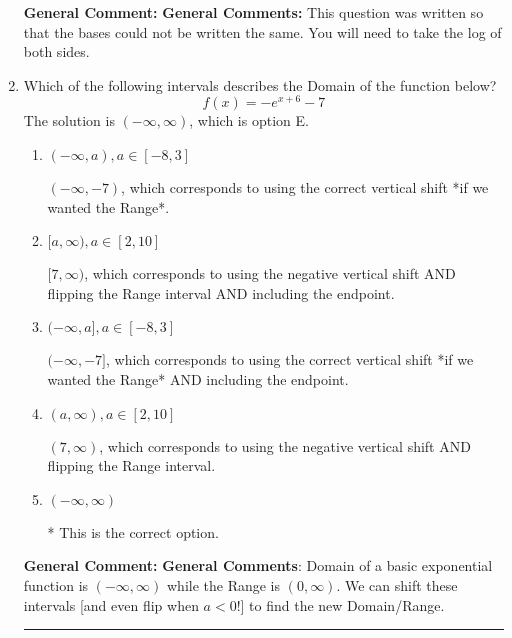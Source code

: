 \documentclass{extbook}[14pt]
\newcommand{\litem}[1]{\item #1

\rule{\textwidth}{0.4pt}}
\begin{document}
\begin{enumerate}
{\textbf{General Comment:} \textbf{General Comments:} This question was written so that the bases could not be written the same. You will need to take the log of both sides.
}
\litem{
Which of the following intervals describes the Domain of the function below?
\[ f(x) = -e^{x+6}-7 \]The solution is \( (-\infty, \infty) \), which is option E.\begin{enumerate}[label=\Alph*.]
\item \( (-\infty, a), a \in [-8, 3] \)

$(-\infty, -7)$, which corresponds to using the correct vertical shift *if we wanted the Range*.
\item \( [a, \infty), a \in [2, 10] \)

$[7, \infty)$, which corresponds to using the negative vertical shift AND flipping the Range interval AND including the endpoint.
\item \( (-\infty, a], a \in [-8, 3] \)

$(-\infty, -7]$, which corresponds to using the correct vertical shift *if we wanted the Range* AND including the endpoint.
\item \( (a, \infty), a \in [2, 10] \)

$(7, \infty)$, which corresponds to using the negative vertical shift AND flipping the Range interval.
\item \( (-\infty, \infty) \)

* This is the correct option.
\end{enumerate}

\textbf{General Comment:} \textbf{General Comments}: Domain of a basic exponential function is $(-\infty, \infty)$ while the Range is $(0, \infty)$. We can shift these intervals [and even flip when $a<0$!] to find the new Domain/Range.
}
\end{enumerate}
\end{document}
